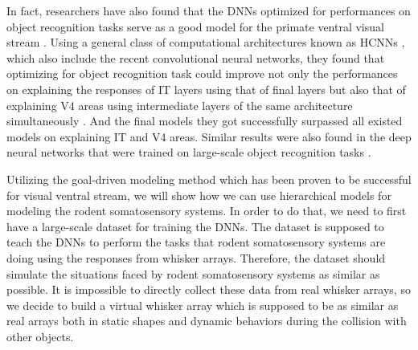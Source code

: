In fact, researchers have also found that the DNNs optimized for performances on object recognition tasks serve as a good model for the primate ventral visual stream \cite{Yamins2013, Yamins2014, Cadieu2014}.
Using a general class of computational architectures known as HCNNs \cite{lecun1995convolutional}, which also include the recent convolutional neural networks, they found that optimizing for object recognition task could improve not only the performances on explaining the responses of IT layers using that of final layers but also that of explaining V4 areas using intermediate layers of the same architecture simultaneously \cite{Cadieu2014}.
And the final models they got successfully surpassed all existed models on explaining IT and V4 areas. Similar results were also found in the deep neural networks that were trained on large-scale object recognition tasks \cite{Yamins2014}.

Utilizing the goal-driven modeling method which has been proven to be successful for visual ventral stream, we will show how we can use hierarchical models for modeling the rodent somatosensory systems.
In order to do that, we need to first have a large-scale dataset for training the DNNs.
The dataset is supposed to teach the DNNs to perform the tasks that rodent somatosensory systems are doing using the responses from whisker arrays.
Therefore, the dataset should simulate the situations faced by rodent somatosensory systems as similar as possible. It is impossible to directly collect these data from real whisker arrays, so we decide to build a virtual whisker array which is supposed to be as similar as real arrays both in static shapes and dynamic behaviors during the collision with other objects.

